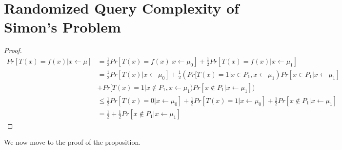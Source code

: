 \section{Randomized Query Complexity of Simon's Problem}
\begin{proof}
    \begin{align*}
        Pr[T(x) = f(x) \vert x \leftarrow \mu] &= \frac{1}{2}Pr[T(x) = f(x) \vert x \leftarrow \mu_0]  +\frac{1}{2}Pr[T(x) = f(x) \vert x \leftarrow \mu_1]
        \\ &= \frac{1}{2}Pr[T(x) \vert x \leftarrow \mu_0] + \frac{1}{2}(Pr[T(x) = 1 \vert x \in P_1, x \leftarrow \mu_1)Pr[x \in P_1 \vert x \leftarrow \mu_1] 
        \\ &+ Pr[T(x) = 1 \vert x \notin P_1, x \leftarrow \mu_1)Pr[x \notin P_1 \vert x \leftarrow \mu_1])
        \\ &\leq  \frac{1}{2}Pr[T(x) = 0 \vert x \leftarrow \mu_0] + \frac{1}{2}Pr[T(x) = 1 \vert x \leftarrow \mu_0] + \frac{1}{2}Pr[x \notin P_1 \vert x \leftarrow \mu_1]
        \\ &= \frac{1}{2} + \frac{1}{2}Pr[x \notin P_1 \vert x \leftarrow \mu_1]
    \end{align*}
\end{proof}
We now move to the proof of the proposition. 
